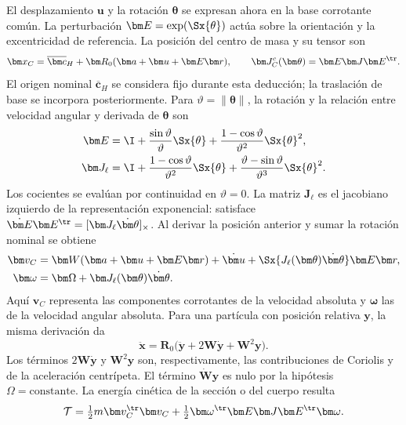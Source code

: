 El desplazamiento $\bm u$ y la rotación $\bm\theta$ se expresan ahora en la base corrotante común. La perturbación $\bm E=\exp(\Sx{\theta})$ actúa sobre la orientación y la excentricidad de referencia. La posición del centro de masa y su tensor son
\begin{equation}
\bm x_C=\overline{\bm c}_H+\bm R_0(\bm a+\bm u+\bm E\bm r),\qquad
\bm J_C^{c}(\bm\theta)=\bm E\bm J\bm E^\tr.
\end{equation}
El origen nominal $\overline{\bm c}_H$ se considera fijo durante esta deducción; la traslación de base se incorpora posteriormente. Para $\vartheta=\|\bm\theta\|$, la rotación y la relación entre velocidad angular y derivada de $\bm\theta$ son
\begin{align}
\bm E&=\I+\frac{\sin\vartheta}{\vartheta}\Sx{\theta}
+\frac{1-\cos\vartheta}{\vartheta^2}\Sx{\theta}^2,\nonumber\\
\bm J_\ell&=\I+\frac{1-\cos\vartheta}{\vartheta^2}\Sx{\theta}
+\frac{\vartheta-\sin\vartheta}{\vartheta^3}\Sx{\theta}^2.
\label{eq:jacobiano}
\end{align}
Los cocientes se evalúan por continuidad en $\vartheta=0$. La matriz $\bm J_\ell$ es el jacobiano izquierdo de la representación exponencial: satisface $\dot{\bm E}\bm E^\tr=[\bm J_\ell\dot{\bm\theta}]_\times$. Al derivar la posición anterior y sumar la rotación nominal se obtiene
\begin{align}
\bm v_C&=\bm W(\bm a+\bm u+\bm E\bm r)+\dot{\bm u}
+\Sx{J_\ell(\bm\theta)\dot{\bm\theta}}\bm E\bm r,\nonumber\\
\bm\omega&=\bm\Omega+\bm J_\ell(\bm\theta)\dot{\bm\theta}.
\label{eq:exactvelocity}
\end{align}
Aquí $\bm v_C$ representa las componentes corrotantes de la velocidad absoluta y $\bm\omega$ las de la velocidad angular absoluta. Para una partícula con posición relativa $\bm y$, la misma derivación da
\begin{equation}
\ddot{\bm x}=\bm R_0
\big(\ddot{\bm y}+2\bm W\dot{\bm y}+\bm W^2\bm y\big).
\label{eq:aceleracion-transporte}
\end{equation}
Los términos $2\bm W\dot{\bm y}$ y $\bm W^2\bm y$ son, respectivamente, las contribuciones de Coriolis y de la aceleración centrípeta. El término $\dot{\bm W}\bm y$ es nulo por la hipótesis $\Omega=\mathrm{constante}$. La energía cinética de la sección o del cuerpo resulta
\begin{equation}
\mathcal T=\tfrac12m\bm v_C^\tr\bm v_C
+\tfrac12\bm\omega^\tr\bm E\bm J\bm E^\tr\bm\omega.
\label{eq:exactT}
\end{equation}

